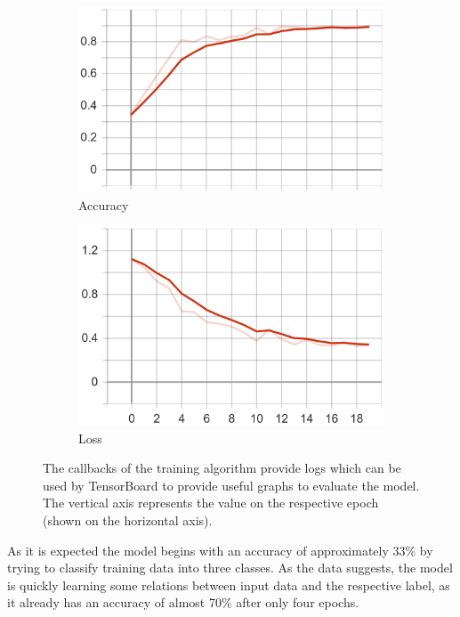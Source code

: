 \begin{figure}
    \centering
    \begin{subfigure}[b]{0.4\textwidth}
        \includegraphics[width=\textwidth]{images/first_model_acc.png}
        \caption{Accuracy}
        \label{fig:first_model_acc}
    \end{subfigure}
    \begin{subfigure}[b]{0.4\textwidth}
        \includegraphics[width=\textwidth]{images/first_model_loss.png}
        \caption{Loss}
        \label{fig:first_model_loss}
    \end{subfigure}
    \caption{The callbacks of the training algorithm provide logs which can be used by TensorBoard to provide useful graphs to evaluate the model. The vertical axis represents the value on the respective epoch (shown on the horizontal axis).}
    \label{fig:first_model_graphs}
\end{figure}

As it is expected the model begins with an accuracy of approximately 33\% by trying to classify training data into three classes.
As the data suggests, the model is quickly learning some relations between input data and the respective label, as it already has an accuracy of almost 70\% after only four epochs.


